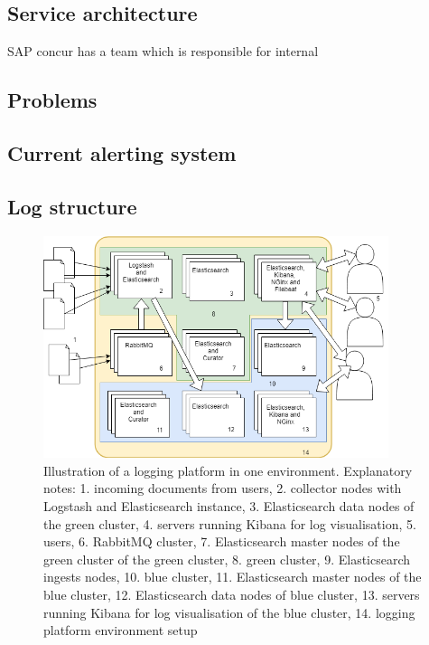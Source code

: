 \subsection{Service architecture}

SAP concur has a team which is responsible for internal 

\subsection{Problems}

\subsection{Current alerting system}

\subsection{Log structure}









\begin{figure}[h]
    \centering
    \includegraphics[width=0.9\textwidth]{figures/dataset/Parpr1Model.png}
    \caption[Illustration of a logging platform in one environment.]{Illustration of a logging platform in one environment. Explanatory notes: 1. incoming documents from users, 2. collector nodes with Logstash and Elasticsearch instance, 3. Elasticsearch data nodes of the green cluster, 4. servers running Kibana for log visualisation, 5. users, 6. RabbitMQ cluster, 7. Elasticsearch master nodes of the green cluster of the green cluster, 8. green cluster, 9. Elasticsearch ingests nodes, 10. blue cluster, 11. Elasticsearch master nodes of the blue cluster, 12. Elasticsearch data nodes of blue cluster, 13. servers running Kibana for log visualisation of the blue cluster, 14. logging platform environment setup}
    \label{fig:loggingPlatformIlustration}
\end{figure}
